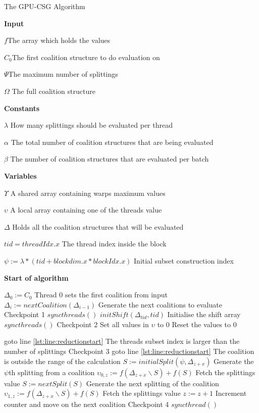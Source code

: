 \documentclass{llncs}
\begin{document}
\begin{algorithm*}[!t]
\caption{The GPU-CSG Algorithm\label{gpudp}}
\textbf{Input}

$f$\hfill The array which holds the values

$C_0$\hfill The first coalition structure to do evaluation on

$\Psi$\hfill The maximum number of splittings

$\Omega$ \hfill The full coalition structure

\textbf{Constants}

$\lambda$ \hfill How many splittings should be evaluated per thread

$\alpha$ \hfill The total number of coalition structures that are being evaluated

$\beta$ \hfill The number of coalition structures that are evaluated per batch

\textbf{Variables} 

$\Upsilon$ \hfill A shared array containing warps maximum values

$\upsilon$ \hfill A local array containing one of the threads value

$\Delta$ \hfill Holds all the coalition structures that will be evaluated

$tid = threadIdx.x$ \hfill The thread index inside the block

$\psi := \lambda*(tid+blockdim.x*blockIdx.x)$ \hfill Initial subset construction index

\textbf{Start of algorithm}
\begin{algorithmic}[1]
  \STATE $\Delta_0 := C_0$ \hfill Thread 0 sets the first coalition from input
    \STATE $\Delta_i := nextCoalition(\Delta_{i-1})$ \hfill Generate the next coalitions to evaluate
  \ENDFOR \hfill Checkpoint 1
\ENDIF
\STATE $syncthreads()$
  \STATE $initShift(\Delta_{tid},tid)$ \hfill Initialise the shift array
\ENDIF
\STATE $syncthreads()$
\hfill Checkpoint 2
\label{lst:line:bigfetch}
  \STATE Set all values in $\upsilon$ to 0 \hfill Reset the values to 0

  \IF{$\psi \geq \Psi$}
    \STATE goto line \ref{lst:line:reductionstart} \hfill The threads subset index is larger than the number of splittings
  \ENDIF
\hfill Checkpoint 3
    \label{lst:line:gotoif}
      \STATE goto line \ref{lst:line:reductionstart} \hfill The coalition is outside the range of the calculation
    \ENDIF
    \STATE $S := initialSplit(\psi,\Delta_{z+x})$ \hfill Generate the $\psi$th splitting from a coalition 
    \STATE $\upsilon_{0,z} := f(\Delta_{z+x}\backslash S)+f(S)$ \hfill Fetch the splittings value
    \STATE $S := nextSplit(S)$ \hfill Generate the next splitting of the coalition
    \STATE $\upsilon_{1,z} := f(\Delta_{z+x}\backslash S)+f(S)$ \hfill Fetch the splittings value
    \STATE $z := z + 1$ \hfill Increment counter and move on the next coalition
  \ENDFOR
\hfill Checkpoint 4
\STATE $syncthread()$
  \label{lst:line:reductionstart}
  

\end{algorithmic}
\end{algorithm*}
\end{document}
